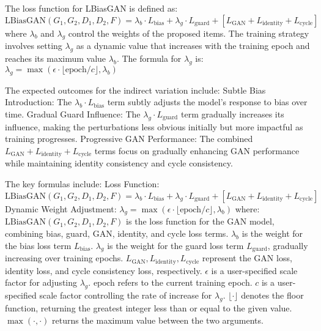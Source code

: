 The loss function for LBiasGAN is defined as:
$ \text{LBiasGAN}(G_1, G_2, D_1, D_2, F) = \lambda_b \cdot L_{\text{bias}} + \lambda_g \cdot L_{\text{guard}} + [L_{\text{GAN}} + L_{\text{identity}} + L_{\text{cycle}}] $
where $ \lambda_b $ and $ \lambda_g $ control the weights of the proposed items.
The training strategy involves setting $ \lambda_g $ as a dynamic value that increases with the training epoch and reaches its maximum value $ \lambda_b $. The formula for $ \lambda_g $ is:
$ \lambda_g = \max(\epsilon \cdot \lfloor \text{epoch} / c \rfloor, \lambda_b) $

The expected outcomes for the indirect variation include:
Subtle Bias Introduction: The $ \lambda_b \cdot L_{\text{bias}} $ term subtly adjusts the model's response to bias over time.
Gradual Guard Influence: The $ \lambda_g \cdot L_{\text{guard}} $ term gradually increases its influence, making the perturbations less obvious initially but more impactful as training progresses.
Progressive GAN Performance: The combined $ L_{\text{GAN}} + L_{\text{identity}} + L_{\text{cycle}} $ terms focus on gradually enhancing GAN performance while maintaining identity consistency and cycle consistency.

The key formulas include:
Loss Function:
$ \text{LBiasGAN}(G_1, G_2, D_1, D_2, F) = \lambda_b \cdot L_{\text{bias}} + \lambda_g \cdot L_{\text{guard}} + [L_{\text{GAN}} + L_{\text{identity}} + L_{\text{cycle}}] $
Dynamic Weight Adjustment:
$ \lambda_g = \max(\epsilon \cdot \lfloor \text{epoch} / c \rfloor, \lambda_b) $
where:
$ \text{LBiasGAN}(G_1, G_2, D_1, D_2, F) $ is the loss function for the GAN model, combining bias, guard, GAN, identity, and cycle loss terms.
$ \lambda_b $ is the weight for the bias loss term $ L_{\text{bias}} $.
$ \lambda_g $ is the weight for the guard loss term $ L_{\text{guard}} $, gradually increasing over training epochs.
$ L_{\text{GAN}}, L_{\text{identity}}, L_{\text{cycle}} $ represent the GAN loss, identity loss, and cycle consistency loss, respectively.
$ \epsilon $ is a user-specified scale factor for adjusting $ \lambda_g $.
$ \text{epoch} $ refers to the current training epoch.
$ c $ is a user-specified scale factor controlling the rate of increase for $ \lambda_g $.
$ \lfloor \cdot \rfloor $ denotes the floor function, returning the greatest integer less than or equal to the given value.
$ \max(\cdot, \cdot) $ returns the maximum value between the two arguments.

